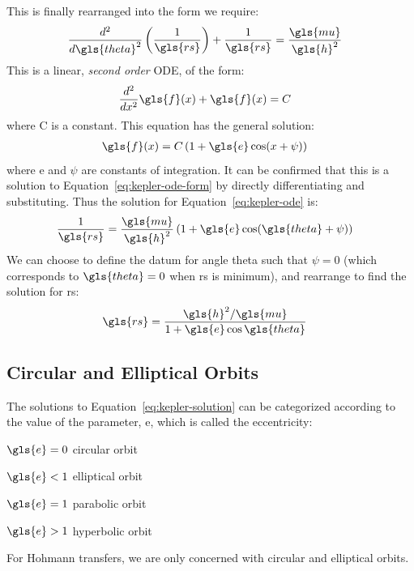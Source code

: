 \documentclass[12pt,openany]{book}
\begin{document}
This is finally rearranged into the form we require:
\begin{align}
  \frac{d^2}{d\gls{theta}^2}\left(\frac{1}{\gls{rs}}\right) + \frac{1}{\gls{rs}}
  &= \frac{\gls{mu}}{\gls{h}^2} \label{eq:kepler-ode}
\end{align}
This is a linear, \emph{second order} ODE, of the form:
\begin{align}
  \frac{d^2}{dx^2}\gls{f}(x) + \gls{f}(x) &= C \label{eq:kepler-ode-form}
\end{align}
where C is a constant. This equation has the general solution:
\begin{align}
  \gls{f}(x) &= C\left(1 + \gls{e}\cos(x + \psi)\right)
\end{align}
where \gls{e} and \(\psi\) are constants of integration. It can be confirmed that this is a solution to Equation~\ref{eq:kepler-ode-form} by directly differentiating and substituting. Thus the solution for Equation~\ref{eq:kepler-ode} is:
\begin{align}
  \frac{1}{\gls{rs}}
  &= \frac{\gls{mu}}{\gls{h}^2}
  \left(
    1 + \gls{e}\cos(\gls{theta} + \psi)
  \right)
\end{align}
We can choose to define the datum for angle \gls{theta} such that \(\psi = 0\) (which corresponds to \(\gls{theta} = 0\) when \gls{rs} is minimum), and rearrange to find the solution for \gls{rs}:
\begin{align}
  \gls{rs} &= \frac{\gls{h}^2/\gls{mu}}{1 + \gls{e}\cos\gls{theta}} \label{eq:kepler-solution}
\end{align}

\subsection{Circular and Elliptical Orbits}

The solutions to Equation~\ref{eq:kepler-solution} can be categorized according to the value of the parameter, \gls{e}, which is called the eccentricity:
\begin{pardescription}[leftmargin=4em,style=nextline]
\item[\(\gls{e} = 0\)] circular orbit
\item[\(\gls{e} < 1\)] elliptical orbit
\item[\(\gls{e} = 1\)] parabolic orbit
\item[\(\gls{e} > 1\)] hyperbolic orbit
\end{pardescription}
For Hohmann transfers, we are only concerned with circular and elliptical orbits.
\end{document}
